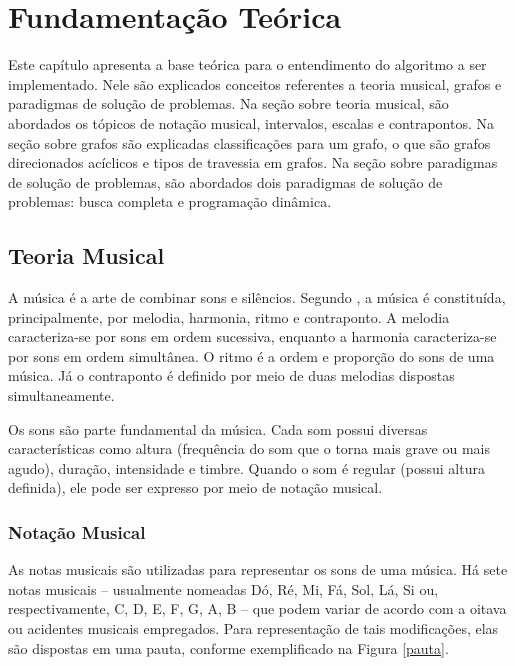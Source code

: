 \chapter[Fundamentação Teórica]{Fundamentação Teórica} \label{c1}

  Este capítulo apresenta a base teórica para o entendimento do algoritmo a ser implementado. Nele são explicados conceitos referentes a teoria musical, grafos e paradigmas de solução de problemas. Na seção sobre teoria musical, são abordados os tópicos de notação musical, intervalos, escalas e contrapontos. Na seção sobre grafos são explicadas classificações para um grafo, o que são grafos direcionados acíclicos e tipos de travessia em grafos. Na seção sobre paradigmas de solução de problemas, são abordados dois paradigmas de solução de problemas: busca completa e programação dinâmica.

  \section[Teoria Musical]{Teoria Musical}

    A música é a arte de combinar sons e silêncios. Segundo , a música é constituída, principalmente, por melodia, harmonia, ritmo e contraponto. A melodia caracteriza-se por sons em ordem sucessiva, enquanto a harmonia caracteriza-se por sons em ordem simultânea. O ritmo é a ordem e proporção do sons de uma música. Já o contraponto é definido por meio de duas melodias dispostas simultaneamente.

    Os sons são parte fundamental da música. Cada som possui diversas características como altura (frequência do som que o torna mais grave ou mais agudo), duração, intensidade e timbre. Quando o som é regular (possui altura definida), ele pode ser expresso por meio de notação musical.

    \subsection[Notação Musical]{Notação Musical}

      As notas musicais são utilizadas para representar os sons de uma música. Há sete notas musicais -- usualmente nomeadas Dó, Ré, Mi, Fá, Sol, Lá, Si ou, respectivamente, C, D, E, F, G, A, B -- que podem variar de acordo com a oitava ou acidentes musicais empregados. Para representação de tais modificações, elas são dispostas em uma pauta, conforme exemplificado na Figura \ref{pauta}.

